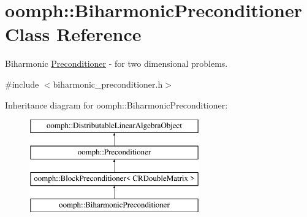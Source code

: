 \hypertarget{classoomph_1_1BiharmonicPreconditioner}{}\section{oomph\+:\+:Biharmonic\+Preconditioner Class Reference}
\label{classoomph_1_1BiharmonicPreconditioner}


Biharmonic \hyperlink{classoomph_1_1Preconditioner}{Preconditioner} -\/ for two dimensional problems.  




{\ttfamily \#include $<$biharmonic\+\_\+preconditioner.\+h$>$}

Inheritance diagram for oomph\+:\+:Biharmonic\+Preconditioner\+:\begin{figure}[H]
\begin{center}
\leavevmode
\includegraphics[height=4.000000cm]{classoomph_1_1BiharmonicPreconditioner}
\end{center}
\end{figure}
